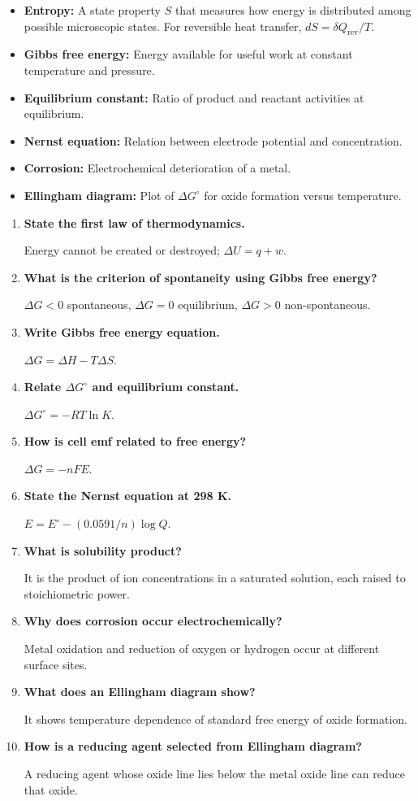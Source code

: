 \documentclass[12pt,a4paper]{article}
\newcommand{\Q}[1]{\textbf{#1}\par\noindent\ignorespaces}
\begin{document}
\begin{tcolorbox}[defbox, title={One-Line Definitions}]
\begin{itemize}[leftmargin=*, itemsep=2pt, topsep=2pt]
  \item \textbf{Entropy:} A state property $S$ that measures how energy is distributed among possible microscopic states. For reversible heat transfer, $dS=\delta Q_{\mathrm{rev}}/T$.
  \item \textbf{Gibbs free energy:} Energy available for useful work at constant temperature and pressure.
  \item \textbf{Equilibrium constant:} Ratio of product and reactant activities at equilibrium.
  \item \textbf{Nernst equation:} Relation between electrode potential and concentration.
  \item \textbf{Corrosion:} Electrochemical deterioration of a metal.
  \item \textbf{Ellingham diagram:} Plot of $\Delta G^\circ$ for oxide formation versus temperature.
\end{itemize}
\end{tcolorbox}

\begin{tcolorbox}[exambox, title={Frequently Asked / Viva Questions}]
\begin{enumerate}[topsep=0pt, label=\textbf{Q\arabic*.}, itemsep=5pt]
  \item \Q{State the first law of thermodynamics.}
    Energy cannot be created or destroyed; $\Delta U=q+w$.
  \item \Q{What is the criterion of spontaneity using Gibbs free energy?}
    $\Delta G<0$ spontaneous, $\Delta G=0$ equilibrium, $\Delta G>0$ non-spontaneous.
  \item \Q{Write Gibbs free energy equation.}
    $\Delta G=\Delta H-T\Delta S$.
  \item \Q{Relate $\Delta G^\circ$ and equilibrium constant.}
    $\Delta G^\circ=-RT\ln K$.
  \item \Q{How is cell emf related to free energy?}
    $\Delta G=-nFE$.
  \item \Q{State the Nernst equation at 298 K.}
    $E=E^\circ-(0.0591/n)\log Q$.
  \item \Q{What is solubility product?}
    It is the product of ion concentrations in a saturated solution, each raised to stoichiometric power.
  \item \Q{Why does corrosion occur electrochemically?}
    Metal oxidation and reduction of oxygen or hydrogen occur at different surface sites.
  \item \Q{What does an Ellingham diagram show?}
    It shows temperature dependence of standard free energy of oxide formation.
  \item \Q{How is a reducing agent selected from Ellingham diagram?}
    A reducing agent whose oxide line lies below the metal oxide line can reduce that oxide.
\end{enumerate}
\end{tcolorbox}
\end{document}
